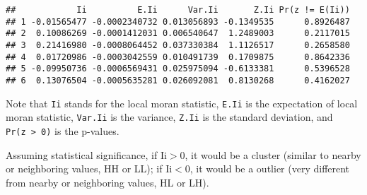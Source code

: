 \documentclass[
]{article}
\begin{document}
\begin{verbatim}
##            Ii          E.Ii      Var.Ii       Z.Ii Pr(z != E(Ii))
## 1 -0.01565477 -0.0002340732 0.013056893 -0.1349535      0.8926487
## 2  0.10086269 -0.0001412031 0.006540647  1.2489003      0.2117015
## 3  0.21416980 -0.0008064452 0.037330384  1.1126517      0.2658580
## 4  0.01720986 -0.0003042559 0.010491739  0.1709875      0.8642336
## 5 -0.09950736 -0.0006569431 0.025975094 -0.6133381      0.5396528
## 6  0.13076504 -0.0005635281 0.026092081  0.8130268      0.4162027
\end{verbatim}

Note that \texttt{Ii} stands for the local moran statistic,
\texttt{E.Ii} is the expectation of local moran statistic,
\texttt{Var.Ii} is the variance, \texttt{Z.Ii} is the standard
deviation, and \texttt{Pr(z\ \textgreater{}\ 0)} is the p-values.

Assuming statistical significance, if \(\text{Ii} > 0\), it would be a
cluster (similar to nearby or neighboring values, HH or LL); if
\(\text{Ii} < 0\), it would be a outlier (very different from nearby or
neighboring values, HL or LH).
\end{document}
